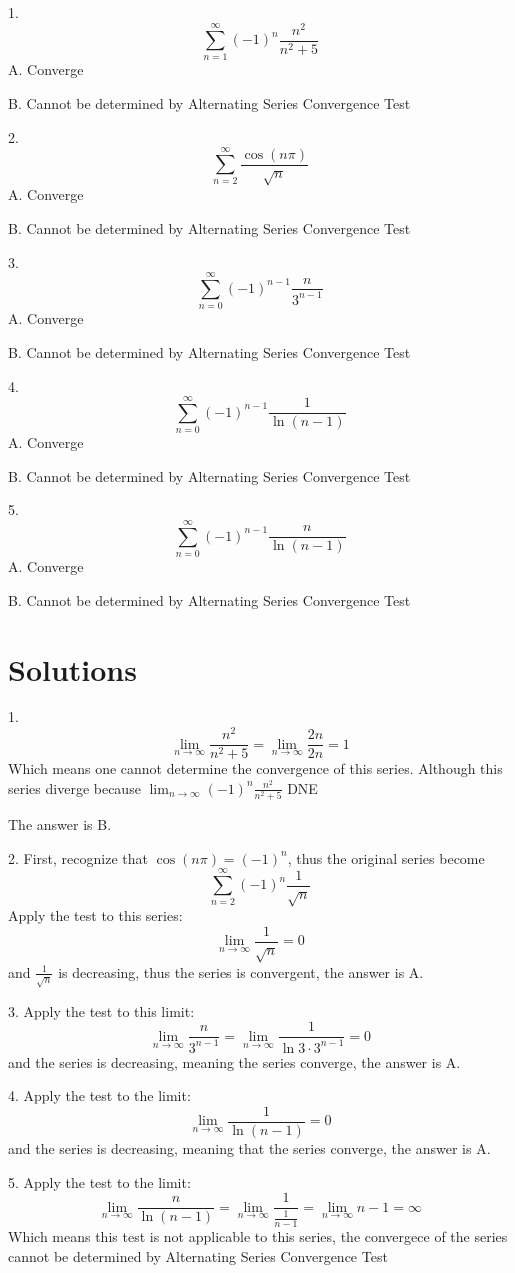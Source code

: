 \documentclass{article}
\numberwithin{equation}{section}
\begin{document}
1. 
\[
\sum_{n=1}^{\infty} (-1)^n\frac{n^2}{n^2+5}
\]
A. Converge 

B. Cannot be determined by Alternating Series Convergence Test

2. 
\[
\sum_{n=2}^{\infty} \frac{\cos(n\pi)}{\sqrt{n}}
\]
A. Converge 

B. Cannot be determined by Alternating Series Convergence Test

3. 
\[
\sum_{n=0}^{\infty}(-1)^{n-1} \frac{n}{3^{n-1}}
\]
A. Converge 

B. Cannot be determined by Alternating Series Convergence Test

4. 
\[
\sum_{n=0}^{\infty}(-1)^{n-1} \frac{1}{\ln (n-1)}
\]
A. Converge 

B. Cannot be determined by Alternating Series Convergence Test

5. 
\[
\sum_{n=0}^{\infty}(-1)^{n-1} \frac{n}{\ln (n-1)}
\]
A. Converge 

B. Cannot be determined by Alternating Series Convergence Test
\section{Solutions}
1.
\[
\lim_{n\to \infty} \frac{n^2}{n^2+5}
= \lim_{n\to \infty} \frac{2n}{2n}
= 1
\]
Which means one cannot determine the convergence of this series. Although this series diverge because $\displaystyle \lim_{n\to \infty} (-1)^n \frac{n^2}{n^2+5}$ DNE

The answer is B.

2. First, recognize that $\cos (n\pi) = (-1)^n$, thus the original series become
\[
\sum_{n=2}^{\infty} (-1)^n \frac{1}{\sqrt{n}}
\]
Apply the test to this series:
\[
\lim_{n\to\infty} \frac{1}{\sqrt{n}}
= 0
\]
and $\displaystyle \frac{1}{\sqrt{n}}$ is decreasing, thus the series is convergent, the answer is A.

3. Apply the test to this limit:
\[
\lim_{n\to\infty} \frac{n}{3^{n-1}} 
=\lim_{n\to\infty} \frac{1}{\ln 3 \cdot 3^{n-1}}
=0
\]
and the series is decreasing, meaning the series converge, the answer is A.

4. Apply the test to the limit:
\[
\lim_{n\to\infty} \frac{1}{\ln(n-1)} = 0
\]
and the series is decreasing, meaning that the series converge, the answer is A.

5. Apply the test to the limit:
\[
\lim_{n\to \infty} \frac{n}{\ln(n-1)}
= \lim_{n\to\infty} \frac{1}{\frac{1}{n-1}}
= \lim_{n\to\infty} n-1
= \infty
\]
Which means this test is not applicable to this series, the convergece of the series cannot be determined by Alternating Series Convergence Test
\end{document}
